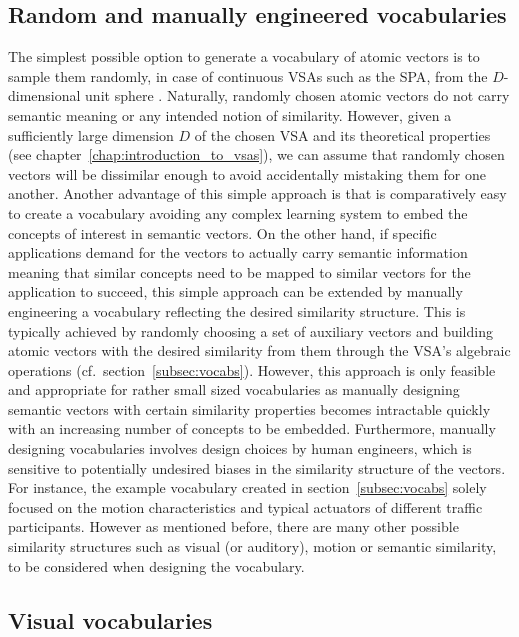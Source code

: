 \subsection{Random and manually engineered vocabularies}%
\label{subsec:basic_random_vocabularies}

The simplest possible option to generate a vocabulary of atomic vectors is to sample them randomly, in case of continuous \acp{VSA} such as the \ac{SPA}, from the $D$-dimensional unit sphere \parencite{Voelker2017}.
Naturally, randomly chosen atomic vectors do not carry semantic meaning or any intended notion of similarity.
However, given a sufficiently large dimension $D$ of the chosen \ac{VSA} and its theoretical properties (see chapter~\ref{chap:introduction_to_vsas}), we can assume that randomly chosen vectors will be dissimilar enough to avoid accidentally mistaking them for one another.
Another advantage of this simple approach is that is comparatively easy to create a vocabulary avoiding any complex learning system to embed the concepts of interest in semantic vectors.
On the other hand, if specific applications demand for the vectors to actually carry semantic information meaning that similar concepts need to be mapped to similar vectors for the application to succeed, this simple approach can be extended by manually engineering a vocabulary reflecting the desired similarity structure.
This is typically achieved by randomly choosing a set of auxiliary vectors and building atomic vectors with the desired similarity from them through the \ac{VSA}'s algebraic operations (cf.\ section~\ref{subsec:vocabs}).
However, this approach is only feasible and appropriate for rather small sized vocabularies as manually designing semantic vectors with certain similarity properties becomes intractable quickly with an increasing number of concepts to be embedded.
Furthermore, manually designing vocabularies involves design choices by human engineers, which is sensitive to potentially undesired biases in the similarity structure of the vectors.
For instance, the example vocabulary created in section~\ref{subsec:vocabs} solely focused on the motion characteristics and typical actuators of different traffic participants.
However as mentioned before, there are many other possible similarity structures such as visual (or auditory), motion or semantic similarity, to be considered when designing the vocabulary.

\subsection{Visual vocabularies}%
\label{subsec:visual_vocabularies}

